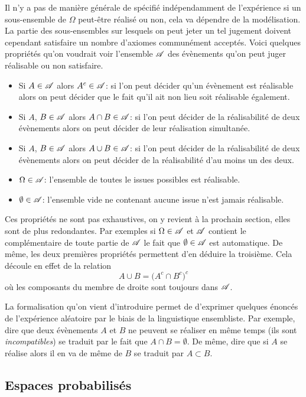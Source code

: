 \documentclass[11pt, a4paper]{article}
\begin{document}
\noindent Il n'y a pas de manière générale de spécifié indépendamment
de l'expérience si un sous-ensemble de $\Omega$ peut-être réalisé ou
non, cela va dépendre de la modélisation. La partie des sous-ensembles
sur lesquels on peut jeter un tel jugement doivent cependant
satisfaire un nombre d'axiomes communément acceptés. Voici quelques
propriétés qu'on voudrait voir l'ensemble $\mathscr{A}$ des évènements
qu'on peut juger réalisable ou non satisfaire.
\begin{itemize}
\item Si $A \in \mathscr{A}$ alors $A^c \in \mathscr{A}$: si l'on peut décider
  qu'un évènement est réalisable alors on peut décider que le fait
  qu'il ait non lieu soit réalisable également.
\item Si $A$, $B \in \mathscr{A}$ alors $A \cap B \in \mathscr{A}$: si l'on peut
  décider de la réalisabilité de deux évènements alors on peut décider
  de leur réalisation simultanée.
\item Si $A$, $B \in \mathscr{A}$ alors $A \cup B \in \mathscr{A}$: si l'on peut
  décider de la réalisabilité de deux évènements alors on peut
  décider de la réalisabilité d'au moins un des deux.
\item $\Omega \in \mathscr{A}$: l'ensemble de toutes le issues possibles
  est réalisable.
\item $\emptyset \in \mathscr{A}$: l'ensemble vide ne contenant aucune
  issue n'est jamais réalisable.
\end{itemize}
Ces propriétés ne sont pas exhaustives, on y revient à la prochain
section, elles sont de plus redondantes. Par exemples si
$\Omega \in \mathscr{A}$ et $\mathscr{A}$ contient le complémentaire de toute
partie de $\mathscr{A}$ le fait que $\emptyset \in \mathscr{A}$ est
automatique. De même, les deux premières propriétés permettent d'en
déduire la troisième. Cela découle en effet de la relation
\[
  A \cup B = \big(A^c \cap B^c\big)^c
\]
où les composants du membre de droite sont toujours dans $\mathscr{A}$.

La formalisation qu'on vient d'introduire permet de d'exprimer
quelques énoncés de l'expérience aléatoire par le biais de la
linguistique ensembliste. Par exemple, dire que deux évènements $A$ et
$B$ ne peuvent se réaliser en même temps (ils sont
\emph{incompatibles}) se traduit par le fait que
$A \cap B = \emptyset$. De même, dire que si $A$ se réalise alors il
en va de même de $B$ se traduit par $A \subset B$.

\subsection{Espaces probabilisés}
\label{sec:espacesprobabilises}
\end{document}
